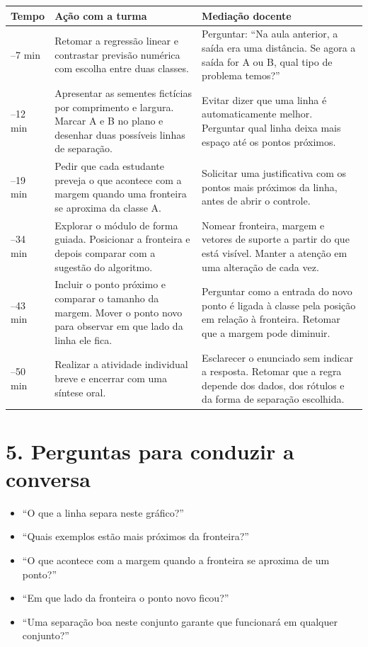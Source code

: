 \documentclass[12pt,a4paper]{article}
\begin{document}
\renewcommand{\arraystretch}{1.18}
\begin{tabularx}{\linewidth}{|>{\centering\arraybackslash}p{1.65cm}|p{5.0cm}|X|}
\hline
\textbf{Tempo} & \textbf{Ação com a turma} & \textbf{Mediação docente} \\
\hline
0--7 min & Retomar a regressão linear e contrastar previsão numérica com escolha entre duas classes. & Perguntar: ``Na aula anterior, a saída era uma distância. Se agora a saída for A ou B, qual tipo de problema temos?'' \\
\hline
7--12 min & Apresentar as sementes fictícias por comprimento e largura. Marcar A e B no plano e desenhar duas possíveis linhas de separação. & Evitar dizer que uma linha é automaticamente melhor. Perguntar qual linha deixa mais espaço até os pontos próximos. \\
\hline
12--19 min & Pedir que cada estudante preveja o que acontece com a margem quando uma fronteira se aproxima da classe A. & Solicitar uma justificativa com os pontos mais próximos da linha, antes de abrir o controle. \\
\hline
19--34 min & Explorar o módulo de forma guiada. Posicionar a fronteira e depois comparar com a sugestão do algoritmo. & Nomear fronteira, margem e vetores de suporte a partir do que está visível. Manter a atenção em uma alteração de cada vez. \\
\hline
34--43 min & Incluir o ponto próximo e comparar o tamanho da margem. Mover o ponto novo para observar em que lado da linha ele fica. & Perguntar como a entrada do novo ponto é ligada à classe pela posição em relação à fronteira. Retomar que a margem pode diminuir. \\
\hline
43--50 min & Realizar a atividade individual breve e encerrar com uma síntese oral. & Esclarecer o enunciado sem indicar a resposta. Retomar que a regra depende dos dados, dos rótulos e da forma de separação escolhida. \\
\hline
\end{tabularx}

\section*{5. Perguntas para conduzir a conversa}

\begin{itemize}
  \item ``O que a linha separa neste gráfico?''
  \item ``Quais exemplos estão mais próximos da fronteira?''
  \item ``O que acontece com a margem quando a fronteira se aproxima de um ponto?''
  \item ``Em que lado da fronteira o ponto novo ficou?''
  \item ``Uma separação boa neste conjunto garante que funcionará em qualquer conjunto?''
\end{itemize}
\end{document}
